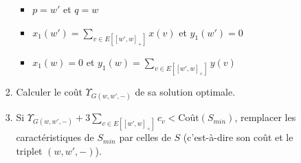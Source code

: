 \begin{enumerate}
\begin{enumerate}
\begin{enumerate}
      \begin{itemize}
      \item $p=w'$ et $q=w$
      \item $x_1(w') = \sum_{v \in E\left[ \left[w',w\right]_+ \right]} x(v)$ et $y_1(w') = 0$
      \item $x_1(w) = 0$ et $y_1(w) = \sum_{v \in E\left[ \left[w',w\right]_+ \right]} y(v)$
      \end{itemize}
    \item Calculer le coût $\Upsilon_{G(w,w',-)}$ de sa solution optimale.
    \item Si $\Upsilon_{G(w,w',-)} + 3 \sum_{ v \in E\left[ \left[w',w\right]_+ \right] }c_v < \mbox{Coût}(S_{min})$, remplacer les caractéristiques de $S_{min}$ par celles de $S$ (c'est-à-dire son coût et le triplet $(w,w',-)$).
    \end{enumerate}
  \end{enumerate}
\end{enumerate}

